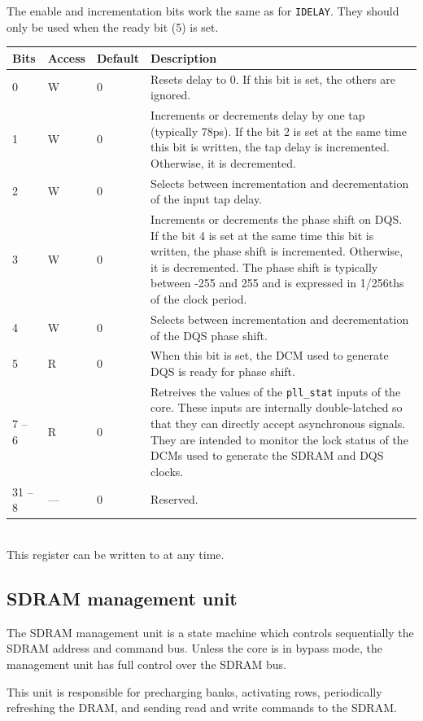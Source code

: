 \documentclass[a4paper,11pt]{article}
\begin{document}
The enable and incrementation bits work the same as for \verb!IDELAY!. They should only be used when the ready bit (5) is set.\\

\begin{tabular}{|p{1.5cm}|l|l|p{10cm}|}
\hline
\bf Bits & \bf Access & \bf Default & \bf Description \\
\hline
0 & W & 0 & Resets delay to 0. If this bit is set, the others are ignored. \\
\hline
1 & W & 0 & Increments or decrements delay by one tap (typically 78ps). If the bit 2 is set at the same time this bit is written, the tap delay is incremented. Otherwise, it is decremented. \\
\hline
2 & W & 0 & Selects between incrementation and decrementation of the input tap delay. \\
\hline
3 & W & 0 & Increments or decrements the phase shift on DQS. If the bit 4 is set at the same time this bit is written, the phase shift is incremented. Otherwise, it is decremented. The phase shift is typically between -255 and 255 and is expressed in 1/256ths of the clock period. \\
\hline
4 & W & 0 & Selects between incrementation and decrementation of the DQS phase shift. \\
\hline
5 & R & 0 & When this bit is set, the DCM used to generate DQS is ready for phase shift. \\
\hline
7 -- 6 & R & 0 & Retreives the values of the \verb!pll_stat! inputs of the core. These inputs are internally double-latched so that they can directly accept asynchronous signals. They are intended to monitor the lock status of the DCMs used to generate the SDRAM and DQS clocks. \\
\hline
31 -- 8 & --- & 0 & Reserved. \\
\hline
\end{tabular}\\

This register can be written to at any time.


\subsection{SDRAM management unit}
The SDRAM management unit is a state machine which controls sequentially the SDRAM address and command bus. Unless the core is in bypass mode, the management unit has full control over the SDRAM bus.

This unit is responsible for precharging banks, activating rows, periodically refreshing the DRAM, and sending read and write commands to the SDRAM.
\end{document}
